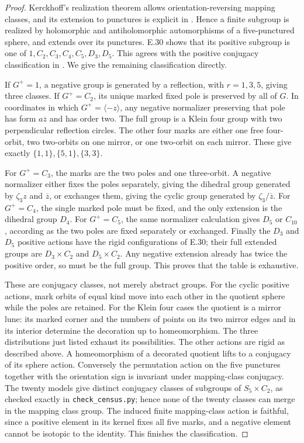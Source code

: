\begin{proof}
Kerckhoff's realization theorem allows orientation-reversing mapping
classes, and its extension to punctures is explicit in
\cite[Section IV, pp.~255--256; Theorem 5]{DE_Kerckhoff1983}.
Hence a finite subgroup is realized by holomorphic and antiholomorphic
automorphisms of a five-punctured sphere, and extends over its
punctures.  E.30 shows that its positive subgroup is one of
$1,C_2,C_3,C_4,C_5,D_3,D_5$.
This agrees with the positive conjugacy classification in
\cite[Theorems 3--4]{DE_Stukow2004}.  We give the remaining
classification directly.

If $G^+=1$, a negative group is generated by a reflection, with
$r=1,3,5$, giving three classes.  If $G^+=C_2$, its unique marked
fixed pole is preserved by all of $G$.  In coordinates in which
$G^+=\langle-z\rangle$, any negative normalizer preserving that
pole has form $a\overline z$ and has order two.  The full group
is a Klein four group with two perpendicular reflection circles.
The other four marks are either one free four-orbit, two two-orbits
on one mirror, or one two-orbit on each mirror.  These give exactly
$\{1,1\},\{5,1\},\{3,3\}$.

For $G^+=C_3$, the marks are the two poles and one three-orbit.
A negative normalizer either fixes the poles separately, giving
the dihedral group generated by $\zeta_3z$ and $\overline z$,
or exchanges them, giving the cyclic group generated by
$\zeta_3/\overline z$.  For $G^+=C_4$, the single marked pole
must be fixed, and the only extension is the dihedral group
$D_4$.  For $G^+=C_5$, the same normalizer calculation gives
$D_5$ or $C_{10}$, according as the two poles are fixed separately
or exchanged.  Finally the $D_3$ and $D_5$ positive actions have
the rigid configurations of E.30; their full extended groups are
$D_3\times C_2$ and $D_5\times C_2$.  Any negative extension
already has twice the positive order, so must be the full group.
This proves that the table is exhaustive.

These are conjugacy classes, not merely abstract groups.  For the
cyclic positive actions, mark orbits of equal kind move into each
other in the quotient sphere while the poles are retained.  For
the Klein four cases the quotient is a mirror lune: its marked
corner and the numbers of points on its two mirror edges and in
its interior determine the decoration up to homeomorphism.  The
three distributions just listed exhaust its possibilities.  The
other actions are rigid as described above.  A homeomorphism of
a decorated quotient lifts to a conjugacy of its sphere action.
Conversely the permutation action on the five punctures together
with the orientation sign is invariant under mapping-class
conjugacy.  The twenty models give distinct conjugacy classes of
subgroups of $S_5\times C_2$, as checked exactly in
\texttt{check\_census.py}; hence none of the twenty classes can
merge in the mapping class group.  The induced finite mapping-class
action is faithful, since a positive element in its kernel fixes
all five marks, and a negative element cannot be isotopic to the
identity.  This finishes the classification.
\end{proof}

